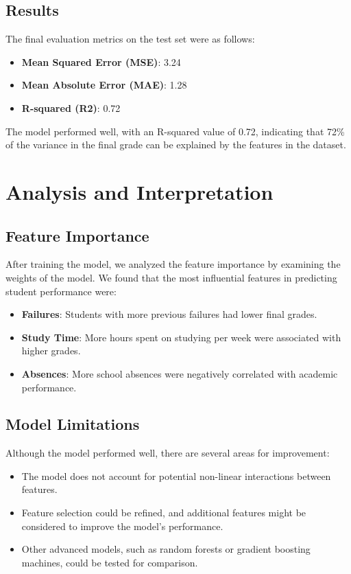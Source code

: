 \documentclass[a4paper,12pt]{article}
\begin{document}
\subsection{Results}
The final evaluation metrics on the test set were as follows:
\begin{itemize}
    \item \textbf{Mean Squared Error (MSE)}: 3.24
    \item \textbf{Mean Absolute Error (MAE)}: 1.28
    \item \textbf{R-squared (R2)}: 0.72
\end{itemize}
The model performed well, with an R-squared value of 0.72, indicating that 72\% of the variance in the final grade can be explained by the features in the dataset.

\section{Analysis and Interpretation}
\subsection{Feature Importance}
After training the model, we analyzed the feature importance by examining the weights of the model. We found that the most influential features in predicting student performance were:
\begin{itemize}
    \item \textbf{Failures}: Students with more previous failures had lower final grades.
    \item \textbf{Study Time}: More hours spent on studying per week were associated with higher grades.
    \item \textbf{Absences}: More school absences were negatively correlated with academic performance.
\end{itemize}

\subsection{Model Limitations}
Although the model performed well, there are several areas for improvement:
\begin{itemize}
    \item The model does not account for potential non-linear interactions between features.
    \item Feature selection could be refined, and additional features might be considered to improve the model's performance.
    \item Other advanced models, such as random forests or gradient boosting machines, could be tested for comparison.
\end{itemize}
\end{document}
